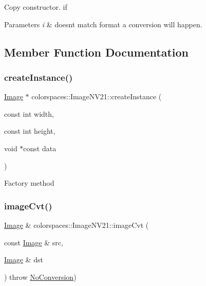 Copy constructor. if 
\begin{DoxyParams}{Parameters}
{\em i} & doesn\textquotesingle{}t match format a conversion will happen. \\
\hline
\end{DoxyParams}


\subsection{Member Function Documentation}
\mbox{\label{classcolorspaces_1_1_image_n_v21_abbde9b9d723828ab4885274347b6e24c}} 
\subsubsection{\texorpdfstring{create\+Instance()}{createInstance()}}
{\footnotesize\ttfamily \hyperlink{classcolorspaces_1_1_image}{Image} $\ast$ colorspaces\+::\+Image\+N\+V21\+::create\+Instance (\begin{DoxyParamCaption}\item[{const int}]{width,  }\item[{const int}]{height,  }\item[{void $\ast$const}]{data }\end{DoxyParamCaption})\hspace{0.3cm}{\ttfamily [static]}}

Factory method \mbox{\label{classcolorspaces_1_1_image_n_v21_a5ffbf749cb0a371b5f83246b994e5dc8}} 
\subsubsection{\texorpdfstring{image\+Cvt()}{imageCvt()}}
{\footnotesize\ttfamily \hyperlink{classcolorspaces_1_1_image}{Image} \& colorspaces\+::\+Image\+N\+V21\+::image\+Cvt (\begin{DoxyParamCaption}\item[{const \hyperlink{classcolorspaces_1_1_image}{Image} \&}]{src,  }\item[{\hyperlink{classcolorspaces_1_1_image}{Image} \&}]{dst }\end{DoxyParamCaption}) throw  \hyperlink{classcolorspaces_1_1_image_1_1_no_conversion}{No\+Conversion}) \hspace{0.3cm}{\ttfamily [static]}}

